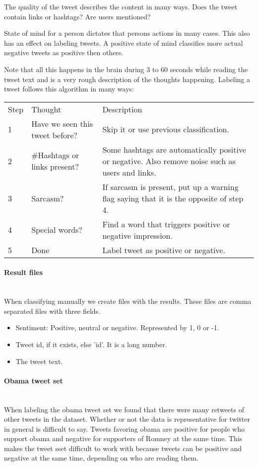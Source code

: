 The quality of the tweet describes the content in many ways. Does the tweet
contain links or hashtags? Are users mentioned?

State of mind for a person dictates that persons actions in many cases. This
also has an effect on labeling tweets. A positive state of mind classifies more
actual negative tweets as positive then others.

Note that all this happens in the brain during 3 to 60 seconds while reading
the tweet text and is a very rough description of the thoughts happening.
Labeling a tweet follows this algorithm in many ways:

\begin{tabular}{ l p{3cm} p{6cm} }
Step & Thought & Description \\
1 & Have we seen this tweet before? & Skip it or use previous classification. \\
2 & \#Hashtags or links present? & Some hashtags are automatically positive or
negative. Also remove noise such as users and links.\\
3 & Sarcasm? & If sarcasm is present, put up a warning flag saying that it is
the opposite of step 4.\\
4 & Special words? & Find a word that triggers positive or negative
impression.\\
5 & Done & Label tweet as positive or negative.\\
\end{tabular}

\paragraph{Result files}
\hspace{0pt}\\
When classifying manually we create files with the results. These files
are comma separated files with three fields.
\begin{itemize}
    \item Sentiment: Positive, neutral or negative. Represented by 1, 0 or -1.
    \item Tweet id, if it exists, else 'id'. It is a long number.
    \item The tweet text.
\end{itemize}

\paragraph{Obama tweet set}
\hspace{0pt}\\
When labeling the obama tweet set we found that there were many retweets of
other tweets in the dataset. Whether or not the data is representative for
twitter in general is difficult to say. Tweets favoring obama are positive for
people who support obama and negative for supporters of Romney at the same
time. This makes the tweet sset difficult to work with because tweets can be
positive and negative at the same time, depending on who are reading them.  

